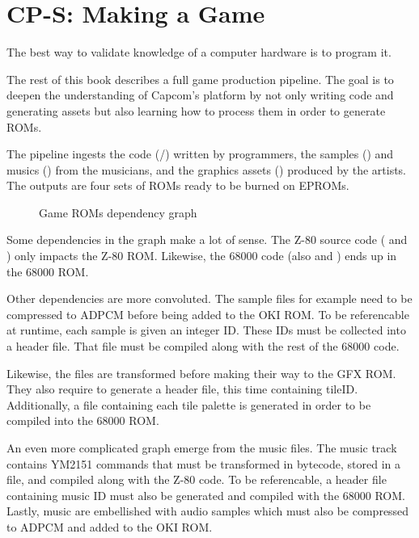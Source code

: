 \chapter{CP-S: Making a Game}

The best way to validate knowledge of a computer hardware is to program it. 

The rest of this book describes a full game production pipeline. The goal is to deepen the understanding of Capcom's platform by not only writing code and generating assets but also learning how to process them in order to generate ROMs.

The pipeline ingests the code (/) written by programmers, the samples () and musics () from the musicians, and the graphics assets () produced by the artists. The outputs are four sets of ROMs ready to be burned on EPROMs. 

 \begin{figure}[H]
\caption*{Game ROMs dependency graph}
\end{figure}

Some dependencies in the graph make a lot of sense. The Z-80 source code ( and ) only impacts the Z-80 ROM. Likewise, the 68000 code (also  and ) ends up in the 68000 ROM.

Other dependencies are more convoluted. The  sample files for example need to be compressed to ADPCM before being added to the OKI ROM. To be referencable at runtime, each sample is given an integer ID. These IDs must be collected into a  header file. That file must be compiled along with the rest of the 68000 code.

Likewise, the  files are transformed before making their way to the GFX ROM. They also require to generate a  header file, this time containing tileID. Additionally, a  file containing each tile palette is generated in order to be compiled into the 68000 ROM. 

An even more complicated graph emerge from the music  files. The music track contains YM2151 commands that must be transformed in bytecode, stored in a  file, and compiled along with the Z-80 code. To be referencable, a header file containing music ID must also be generated and compiled with the 68000 ROM. Lastly, music are embellished with audio samples which must also be compressed to ADPCM and added to the OKI ROM.

